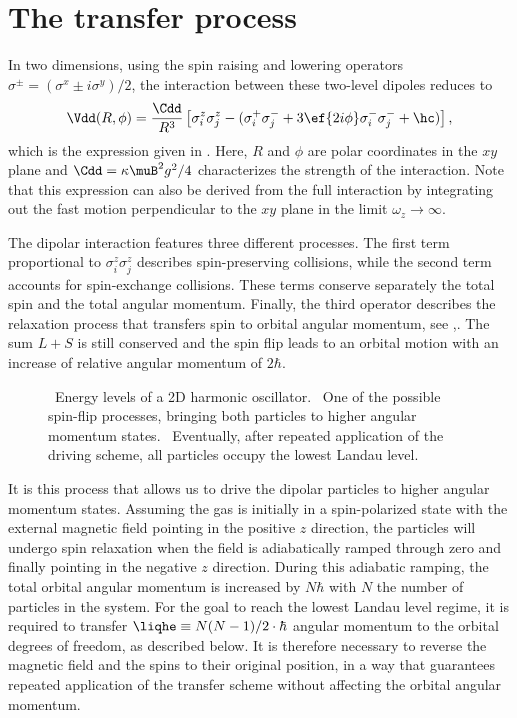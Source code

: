 \section{The transfer process}
In two dimensions, using the spin raising and lowering operators $\sigma^{\pm} = (\sigma^x \pm i \sigma^y)/2$, the interaction between these two-level dipoles reduces to
\begin{align}
\Vdd(R,\phi) =  \frac{\Cdd}{R^3} \left[
\sigma^z_i \sigma^z_j - (\sigma^+_i \sigma^-_j +3 \ef{2i\phi} \sigma^-_i \sigma^-_j  +\hc)
\right],
\end{align}
which is the expression given in . Here, $R$ and $\phi$ are polar coordinates in the $xy$ plane and $\Cdd = \kappa \muB^2 g^2 / 4$ characterizes the strength of the interaction.
Note that this expression can also be derived from the full interaction  by integrating out the fast motion perpendicular to the $xy$ plane in the limit $\omega_z\rightarrow\infty$.

The dipolar interaction features three different processes. The first term proportional to $\sigma^z_i\sigma^z_j$ describes spin-preserving collisions, while the second term  accounts for spin-exchange collisions. These terms conserve separately the total spin and the total angular momentum.  Finally, the third operator  describes the relaxation process that transfers spin to orbital angular momentum, see ,. The sum $L+S$ is still conserved and the spin flip leads to an orbital motion with an increase of relative angular momentum of $2\hbar$.

\begin{figure}[t]
    \centering
    \caption{\sfA~Energy levels of a 2D harmonic oscillator. \sfB~One of the possible spin-flip processes, bringing both particles to higher angular momentum states. \sfC~Eventually, after repeated application of the driving scheme, all particles occupy the lowest Landau level.}
\end{figure}

It is this process that allows us to drive the dipolar particles to higher angular momentum states. Assuming the gas is initially in a spin-polarized state with the external magnetic field pointing in the positive $z$ direction, the particles will undergo spin relaxation when the field is adiabatically ramped through zero and finally pointing in the negative $z$ direction. During this adiabatic ramping,
the total orbital angular momentum is increased by $N\hbar$ with $N$ the number of particles in the system.  For the goal to reach the lowest Landau level regime, it is required to transfer  $\liqhe\equiv N(N-1)/2 \cdot \hbar$ angular momentum to the orbital degrees of freedom, as described below. It is therefore necessary to reverse the magnetic field and the spins to their original position, in a way that guarantees repeated application of the transfer scheme without affecting the orbital angular momentum.

